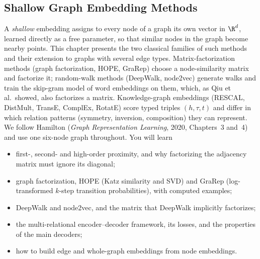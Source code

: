 \begin{notechapter}
\forgetcs\frobnorm\newcommand{\frobnorm}[1]{\left\| #1 \right\|_F}
\forgetcs\adj\newcommand{\adj}{\mathbf{A}}
\forgetcs\degree\newcommand{\degree}{\mathbf{D}}
\forgetcs\lamark\newcommand{\lamark}{\mathbf{L}}
\forgetcs\embed\newcommand{\embed}{\mathbf{Y}}
\forgetcs\similarity\newcommand{\similarity}{\mathbf{S}}
\forgetcs\transition\newcommand{\transition}{\mathbf{P}}
\forgetcs\identity\newcommand{\identity}{\mathbf{I}}
\forgetcs\vect\newcommand{\vect}[1]{\mathbf{#1}}
\chapter{Shallow Graph Embedding Methods}\label{ch:shallow-embeddings}

\begin{chapterintro}
A \emph{shallow} embedding assigns to every node of a graph its own vector in $\R^d$, learned directly as a free parameter, so that similar nodes in the graph become nearby points. This chapter presents the two classical families of such methods and their extension to graphs with several edge types. Matrix-factorization methods (graph factorization, HOPE, GraRep) choose a node-similarity matrix and factorize it; random-walk methods (DeepWalk, node2vec) generate walks and train the skip-gram model of word embeddings on them, which, as Qiu et al.\ showed, also factorizes a matrix. Knowledge-graph embeddings (RESCAL, DistMult, TransE, ComplEx, RotatE) score typed triples $(h, \tau, t)$ and differ in which relation patterns (symmetry, inversion, composition) they can represent. We follow Hamilton (\emph{Graph Representation Learning}, 2020, Chapters~3 and~4) and use one six-node graph throughout. You will learn
\begin{itemize}[nosep]
  \item first-, second- and high-order proximity, and why factorizing the adjacency matrix must ignore its diagonal;
  \item graph factorization, HOPE (Katz similarity and SVD) and GraRep (log-transformed $k$-step transition probabilities), with computed examples;
  \item DeepWalk and node2vec, and the matrix that DeepWalk implicitly factorizes;
  \item the multi-relational encoder--decoder framework, its losses, and the properties of the main decoders;
  \item how to build edge and whole-graph embeddings from node embeddings.
\end{itemize}
\end{chapterintro}


\end{notechapter}
